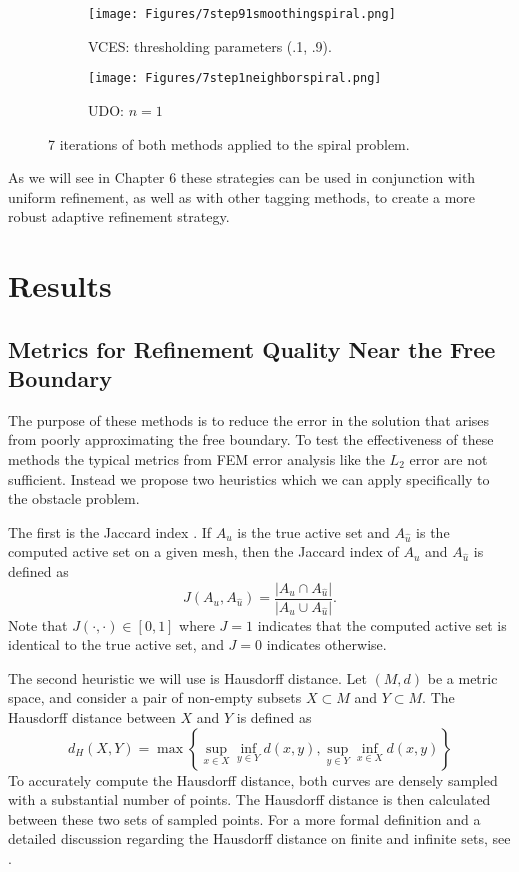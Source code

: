 \documentclass[12 pt]{report}
\begin{document}
\begin{figure}[H]
  \centering
  \begin{subfigure}[b]{0.45\textwidth}
      \centering
      \texttt{[image: Figures/7step91smoothingspiral.png]}
      \caption{VCES: thresholding parameters (.1, .9).}
      \label{fig:image1}
  \end{subfigure}
  \hfill
  \begin{subfigure}[b]{0.45\textwidth}
      \centering
      \texttt{[image: Figures/7step1neighborspiral.png]}
      \caption{UDO: $n = 1$}
      \label{fig:image2}
  \end{subfigure}
  \vspace*{.25cm}
  \caption{7 iterations of both methods applied to the spiral problem.}
  \label{fig:two_images}
\end{figure}

As we will see in Chapter 6 these strategies can be used in conjunction with uniform refinement, as well as with other tagging methods, to create a more robust adaptive refinement strategy.


\chapter{Results}
\section{Metrics for Refinement Quality Near the Free Boundary}
The purpose of these methods is to reduce the error in the solution that arises from poorly approximating the free boundary. To test the effectiveness of these methods the typical metrics from FEM error analysis like the $L_2$ error are not sufficient. Instead we propose two heuristics which we can apply specifically to the obstacle problem.

The first is the Jaccard index \citep{kosub_note_2016}. If $A_u$ is the true active set and $A_{\hat{u}}$ is the computed active set on a given mesh, then the Jaccard index of $A_u$ and $A_{\hat{u}}$ is defined as
\begin{equation}
  J(A_u, A_{\hat{u}}) = \frac{|A_u \cap A_{\hat{u}}|}{|A_u \cup A_{\hat{u}}|}.
\end{equation}
Note that $J(\cdot, \cdot) \in [0, 1]$ where $J = 1$ indicates that the computed active set is identical to the true active set, and $J = 0$ indicates otherwise.   

The second heuristic we will use is Hausdorff distance. Let $(M, d)$ be a metric space, and consider a pair of non-empty subsets $X \subset M$ and $Y \subset M$. The Hausdorff distance between $X$ and $Y$ is defined as 
\begin{equation}
d_H(X, Y) = \max\left\{\sup_{x \in X} \inf_{y \in Y} d(x, y), \sup_{y \in Y} \inf_{x \in X} d(x, y)\right\}
\end{equation}
To accurately compute the Hausdorff distance, both curves are densely sampled with a substantial number of points. The Hausdorff distance is then calculated between these two sets of sampled points. For a more formal definition and a detailed discussion regarding the Hausdorff distance on finite and infinite sets, see \citet{jungeblut_complexity_2022}.
\end{document}
